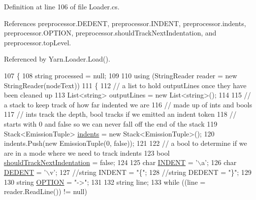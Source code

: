 Definition at line 106 of file Loader.\-cs.



References preprocessor.\-D\-E\-D\-E\-N\-T, preprocessor.\-I\-N\-D\-E\-N\-T, preprocessor.\-indents, preprocessor.\-O\-P\-T\-I\-O\-N, preprocessor.\-should\-Track\-Next\-Indentation, and preprocessor.\-top\-Level.



Referenced by Yarn.\-Loader.\-Load().


\begin{DoxyCode}
107         \{
108             \textcolor{keywordtype}{string} processed = null;
109 
110             \textcolor{keyword}{using} (StringReader reader = \textcolor{keyword}{new} StringReader(nodeText))
111             \{
112                 \textcolor{comment}{// a list to hold outputLines once they have been cleaned up}
113                 List<string> outputLines = \textcolor{keyword}{new} List<string>();
114 
115                 \textcolor{comment}{// a stack to keep track of how far indented we are}
116                 \textcolor{comment}{// made up of ints and bools}
117                 \textcolor{comment}{// ints track the depth, bool tracks if we emitted an indent token}
118                 \textcolor{comment}{// starts with 0 and false so we can never fall off the end of the stack}
119                 Stack<EmissionTuple> \hyperlink{a00351_a00fba9ee9674b2513dbe28eab795b734}{indents} = \textcolor{keyword}{new} Stack<EmissionTuple>();
120                 indents.Push(\textcolor{keyword}{new} EmissionTuple(0, \textcolor{keyword}{false}));
121 
122                 \textcolor{comment}{// a bool to determine if we are in a mode where we need to track indents}
123                 \textcolor{keywordtype}{bool} \hyperlink{a00351_afa485f45ab87bc0f06c1dfc46737c057}{shouldTrackNextIndentation} = \textcolor{keyword}{false};
124 
125                 \textcolor{keywordtype}{char} \hyperlink{a00351_ae3f2190a793ab77428838e58e0e83676}{INDENT} = \textcolor{charliteral}{'\(\backslash\)a'};
126                 \textcolor{keywordtype}{char} \hyperlink{a00351_a83653c3e52fa74614e655a91ad2b7181}{DEDENT} = \textcolor{charliteral}{'\(\backslash\)v'};
127                 \textcolor{comment}{//string INDENT = "\{";}
128                 \textcolor{comment}{//string DEDENT = "\}";}
129 
130                 \textcolor{keywordtype}{string} \hyperlink{a00351_a7ca2dc5371587b21476669a45af013cd}{OPTION} = \textcolor{stringliteral}{"->"};
131 
132                 \textcolor{keywordtype}{string} line;
133                 \textcolor{keywordflow}{while} ((line = reader.ReadLine()) != null)

\end{DoxyCode}
